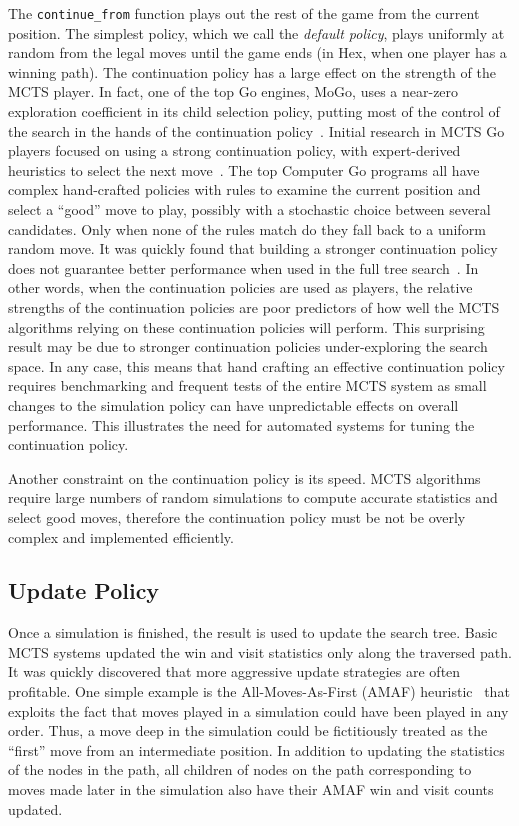 \documentclass{acm_proc_article-sp}
\begin{document}
The \verb+continue_from+ function plays out the rest of the game from the current position. 
The simplest policy, which we call the \emph{default policy},
 plays uniformly at random from the legal moves until the game ends (in Hex, when one player has a winning path). 
The continuation policy has a large effect on the strength of the MCTS player.
In fact, one of the top Go engines, MoGo, uses a near-zero exploration coefficient in its child selection policy,
putting most of the control of the search in the hands of the continuation policy~\cite{gelly2007combining}.
Initial research in MCTS Go players focused on using a strong continuation policy, with expert-derived heuristics to select the next move~\cite{chaslot2010adding}. 
The top Computer Go programs all have complex hand-crafted policies with rules to examine the current position and select a ``good'' move to play, possibly with a stochastic choice between several candidates. 
Only when none of the rules match do they fall back to a uniform random move. 
It was quickly found that building a stronger continuation policy does not guarantee better performance when used in the full tree search~\cite{gelly2006modification}. 
In other words, when the continuation policies are used as players, the relative strengths of the continuation policies are poor predictors
of how well the MCTS algorithms relying on these continuation policies will perform.
This surprising result may be due to stronger continuation policies under-exploring the search space.
In any case, this means that hand crafting an effective continuation policy requires benchmarking and frequent tests of the entire
MCTS system as small changes to the simulation policy can have unpredictable effects on overall performance.
This illustrates the need for automated systems for tuning the continuation policy.

Another constraint on the continuation policy is its speed.  
MCTS algorithms require large numbers of random simulations to compute accurate statistics and select good moves, therefore the continuation policy must be not be overly complex and implemented efficiently.

\subsection{Update Policy}
Once a simulation is finished, the result is used to update the search tree.
Basic MCTS systems updated the win and visit statistics only along the traversed path.
It was quickly discovered that more aggressive update strategies are often profitable.
One simple example is the All-Moves-As-First (AMAF) heuristic~\cite{brugmann1993monte}
that exploits the fact that moves played in a simulation could have been played in any order. 
Thus, a move deep in the simulation could be fictitiously treated as the ``first'' move from an intermediate position. 
In addition to updating the statistics of the nodes in the path, all children of nodes on the path corresponding to moves made later
in the simulation also have their AMAF win and visit counts updated. 
\end{document}
